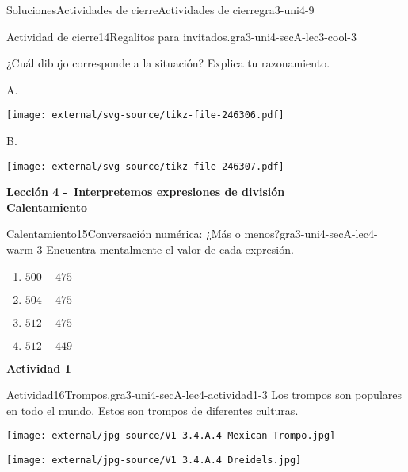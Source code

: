 \documentclass[twoside,10pt,]{article}
\begin{document}
\begin{solutions-section}{Soluciones}{Actividades de cierre}{}{Actividades de cierre}{}{}{gra3-uni4-9}
\begin{projectsolution}{Actividad de cierre}{14}{Regalitos para invitados.}{gra3-uni4-secA-lec3-cool-3}
\par
¿Cuál dibujo corresponde a la situación? Explica tu razonamiento.%
\begin{sidebyside}{2}{0}{0}{0}%
\begin{sbspanel}{0.5}%
A.%
\par
\texttt{[image: external/svg-source/tikz-file-246306.pdf]}
\end{sbspanel}%
\begin{sbspanel}{0.5}%
B.%
\par
\texttt{[image: external/svg-source/tikz-file-246307.pdf]}
\end{sbspanel}%
\end{sidebyside}%
\end{projectsolution}%
\par\medskip
\noindent\textbf{\large{}\space\textperiodcentered\space{}Lección 4 -~Interpretemos expresiones de división\\
\space\textperiodcentered\space{}Calentamiento}
\begin{explorationsolution}{Calentamiento}{15}{Conversación numérica: ¿Más o menos?}{gra3-uni4-secA-lec4-warm-3}%
Encuentra mentalmente el valor de cada expresión.%
\par
%
\begin{enumerate}
\item{}\(\displaystyle 500 - 475\)%
\item{}\(\displaystyle 504 - 475\)%
\item{}\(\displaystyle 512 - 475\)%
\item{}\(\displaystyle 512 - 449\)%
\end{enumerate}
%
\end{explorationsolution}%
\par\medskip
\noindent\textbf{\large{}\space\textperiodcentered\space{}Actividad 1}
\begin{activitysolution}{Actividad}{16}{Trompos.}{gra3-uni4-secA-lec4-actividad1-3}%
Los trompos son populares en todo el mundo. Estos son trompos de diferentes culturas.%
\begin{sidebyside}{5}{0}{0}{0}%
\begin{sbspanel}{0.2}%
\texttt{[image: external/jpg-source/V1 3.4.A.4 Mexican Trompo.jpg]}
\end{sbspanel}%
\begin{sbspanel}{0.2}%
\texttt{[image: external/jpg-source/V1 3.4.A.4 Dreidels.jpg]}
\end{sbspanel}%
\begin{sbspanel}{0.2}%

\end{sbspanel}
\end{sidebyside}
\end{activitysolution}
\end{solutions-section}
\end{document}
